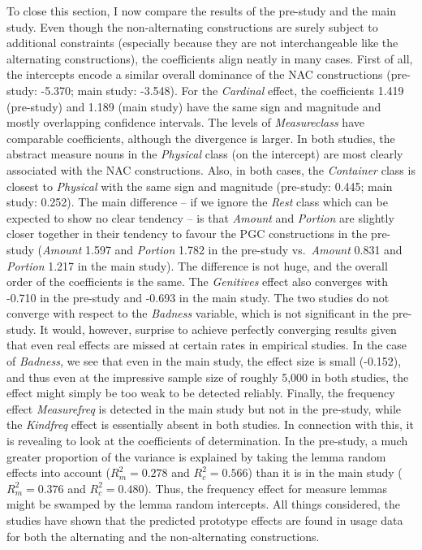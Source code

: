 To close this section, I now compare the results of the pre-study and the main study.
Even though the non-alternating constructions are surely subject to additional constraints (especially because they are not interchangeable like the alternating constructions), the coefficients align neatly in many cases.
First of all, the intercepts encode a similar overall dominance of the NAC constructions (pre-study: -5.370; main study: -3.548).
For the \textit{Cardinal} effect, the coefficients 1.419 (pre-study) and 1.189 (main study) have the same sign and magnitude and mostly overlapping confidence intervals.
The levels of \textit{Measureclass} have comparable coefficients, although the divergence is larger.
In both studies, the abstract measure nouns in the \textit{Physical} class (on the intercept) are most clearly associated with the NAC constructions.
Also, in both cases, the \textit{Container} class is closest to \textit{Physical} with the same sign and magnitude (pre-study: 0.445; main study: 0.252).
The main difference -- if we ignore the \textit{Rest} class which can be expected to show no clear tendency -- is that \textit{Amount} and \textit{Portion} are slightly closer together in their tendency to favour the PGC constructions in the pre-study (\textit{Amount} 1.597 and \textit{Portion} 1.782 in the pre-study vs.\ \textit{Amount} 0.831 and \textit{Portion} 1.217 in the main study).
The difference is not huge, and the overall order of the coefficients is the same.
The \textit{Genitives} effect also converges with -0.710 in the pre-study and -0.693 in the main study.
The two studies do not converge with respect to the \textit{Badness} variable, which is not significant in the pre-study.
It would, however, surprise to achieve perfectly converging results given that even real effects are missed at certain rates in empirical studies.
In the case of \textit{Badness}, we see that even in the main study, the effect size is small (-0.152), and thus even at the impressive sample size of roughly 5,000 in both studies, the effect might simply be too weak to be detected reliably.
Finally, the frequency effect \textit{Measurefreq} is detected in the main study but not in the pre-study, while the \textit{Kindfreq} effect is essentially absent in both studies.
In connection with this, it is revealing to look at the coefficients of determination.
In the pre-study, a much greater proportion of the variance is explained by taking the lemma random effects into account ($R^2_m=0.278$ and $R^2_c=0.566$) than it is in the main study ($R^2_m=0.376$ and $R^2_c=0.480$).
Thus, the frequency effect for measure lemmas might be swamped by the lemma random intercepts.
All things considered, the studies have shown that the predicted prototype effects are found in usage data for both the alternating and the non-alternating constructions.
